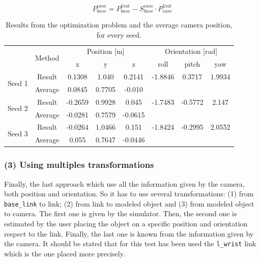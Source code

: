 \documentclass[12pt,a4paper,final,twoside,openright]{report}
\begin{document}
\begin{equation}\label{eq:exp_camera_pose_one_link}
P_{base}^{cam} = P_{base}^{link} - S_{base}^{cam} \cdot P_{cam}^{link} 
\end{equation} 

\begin{table}[h]
\begin{center}
\begin{tabular}{|l|c|c|c|c|c|c|c|}
\hline
 & \multirow{2}{*}{Method} & \multicolumn{3}{|c|}{Position [m]} & \multicolumn{3}{|c|}{Orientation [rad]} \\ \cline{3-8}
 & & x & y & z & roll & pitch & yaw \\ \hline
\multirow{2}{*}{Seed 1} & Result & 0.1308 & 1.040 & 0.2141 & -1.8846 & 0.3717 & 1.9934 \\ \cline{2-8} 
 & Average & 0.0845 & 0.7705 & -0.010 & & & \\ \hline 
\multirow{2}{*}{Seed 2} & Result & -0.2659 & 0.9928 & 0.045 & -1.7483 & -0.5772 & 2.147 \\ \cline{2-8} 
 & Average & -0.0281 & 0.7579 & -0.0615 & & & \\ \hline
\multirow{2}{*}{Seed 3} & Result & -0.0264 & 1.0466 & 0.151 & -1.8424 & -0.2995 & 2.0552 \\ \cline{2-8} 
 & Average & 0.055 & 0.7647 & -0.0446 & & & \\ \hline
\end{tabular}
\caption{Results from the optimization problem and the average camera position, for every seed.\label{tab:exp_visual_pose_three_links_result}}
\end{center}
\end{table}

\subsubsection{(3) Using multiples transformations}

Finally, the last approach which use all the information given by the camera, both position and orientation. So it has to use several transformations: (1) from \texttt{base\_link} to link; (2) from link to modeled object and (3) from modeled object to camera. The first one is given by the simulator. Then, the second one is estimated by the user placing the object on a specific position and orientation respect to the link. Finally, the last one is known from the information given by the camera. It should be stated that for this test has been used the \texttt{l\_wrist} link which is the one placed more precisely. 
\end{document}
